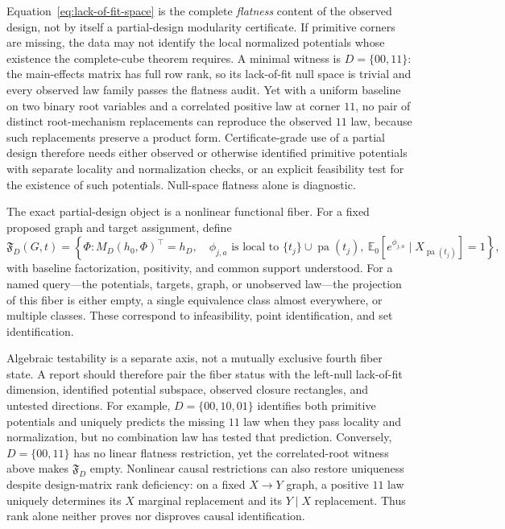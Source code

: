 \documentclass[11pt]{article}
\newcommand{\E}{\mathbb{E}}
\newcommand{\pa}{\operatorname{pa}}
\begin{document}
Equation~\eqref{eq:lack-of-fit-space} is the complete \emph{flatness} content of the observed design, not by itself a partial-design modularity certificate.  If primitive corners are missing, the data may not identify the local normalized potentials whose existence the complete-cube theorem requires.  A minimal witness is \(D=\{00,11\}\): the main-effects matrix has full row rank, so its lack-of-fit null space is trivial and every observed law family passes the flatness audit.  Yet with a uniform baseline on two binary root variables and a correlated positive law at corner \(11\), no pair of distinct root-mechanism replacements can reproduce the observed \(11\) law, because such replacements preserve a product form.  Certificate-grade use of a partial design therefore needs either observed or otherwise identified primitive potentials with separate locality and normalization checks, or an explicit feasibility test for the existence of such potentials.  Null-space flatness alone is diagnostic.

The exact partial-design object is a nonlinear functional fiber.  For a fixed
proposed graph and target assignment, define
\begin{equation}
\mathfrak F_D(G,t)=
\left\{
\Phi:
M_D(h_0,\Phi)^\top=h_D,\quad
\phi_{j,a}\text{ is local to }\{t_j\}\cup\pa(t_j),\
\E_0[e^{\phi_{j,a}}\mid X_{\pa(t_j)}]=1
\right\},
\label{eq:causal-completion-fiber}
\end{equation}
with baseline factorization, positivity, and common support understood.  For a
named query---the potentials, targets, graph, or unobserved law---the projection
of this fiber is either empty, a single equivalence class almost everywhere, or
multiple classes.  These correspond to infeasibility, point identification, and
set identification.

Algebraic testability is a separate axis, not a mutually exclusive fourth
fiber state.  A report should therefore pair the fiber status with the
left-null lack-of-fit dimension, identified potential subspace, observed
closure rectangles, and untested directions.  For example,
\(D=\{00,10,01\}\) identifies both primitive potentials and uniquely predicts
the missing \(11\) law when they pass locality and normalization, but no
combination law has tested that prediction.  Conversely, \(D=\{00,11\}\) has no
linear flatness restriction, yet the correlated-root witness above makes
\(\mathfrak F_D\) empty.  Nonlinear causal restrictions can also restore
uniqueness despite design-matrix rank deficiency: on a fixed \(X\to Y\) graph,
a positive \(11\) law uniquely determines its \(X\) marginal replacement and
its \(Y\mid X\) replacement.  Thus rank alone neither proves nor disproves
causal identification.
\end{document}
